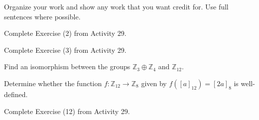 \documentclass[addpoints]{exam}
\begin{document}
Organize your work and show any work that you want credit for. Use full sentences where possible.

\begin{questions}

\question 
Complete Exercise (2) from Activity 29.

\question 
Complete Exercise (3) from Activity 29.

\question Find an isomorphism between the groups $\mathbb{Z}_3\oplus\mathbb{Z}_4$ and $\mathbb{Z}_{12}$.

\question 
Determine whether the function $f\colon \mathbb{Z}_{12}\to\mathbb{Z}_8$ given by $f([a]_{12})=[2a]_8$ is well-defined.

\question 
Complete Exercise (12) from Activity 29.



\end{questions}
\end{document}
